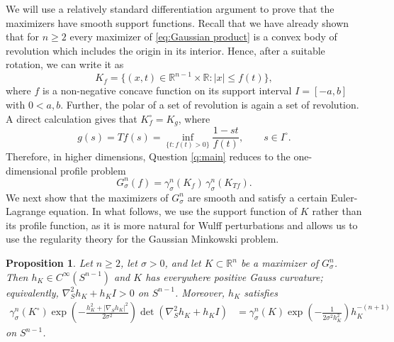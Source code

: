 \documentclass[12pt,oneside,reqno]{amsart}
\numberwithin{equation}{section}
\newtheorem{proposition}[theorem]{Proposition}
\theoremstyle{remark}
\newcommand{\R}{\mathbb R}
\begin{document}
We will use a relatively standard differentiation argument to prove that the maximizers have smooth support functions.
 Recall that we have already shown that for $n\ge 2$ every maximizer of \eqref{eq:Gaussian product} is a convex body of revolution which includes the origin in its interior. Hence, after a suitable rotation, we can write it as
\[
        K_f=\{(x,t)\in\R^{n-1}\times\R: |x|\le f(t)\},
\]
where $f$ is a non-negative concave function on its support interval $I = [-a, b]$ with $0<a,b$. 
Further, the polar of a set of revolution is again a set of revolution. A direct calculation gives that $K_f^\circ=K_g$, where
\begin{equation}\label{eq:T-transform}
        g(s)=Tf(s)=\inf_{\{t:f(t)>0\}}\frac{1-st}{f(t)},\qquad s\in I^\circ.
\end{equation}
Therefore, in higher dimensions, Question \ref{q:main} reduces to the one-dimensional profile problem
\begin{equation}\label{eq:reduced-F}
        G^n_\sigma(f)=\gamma_\sigma^n(K_f)\,\gamma_\sigma^n(K_{Tf}).
\end{equation}
We next show that the maximizers of $G^n_\sigma$ are smooth and satisfy a certain Euler-Lagrange equation. In what follows, we use the support function of \(K\) rather than its profile function, as it is more natural for Wulff perturbations and allows us to use the regularity theory for the Gaussian Minkowski problem.

\begin{proposition}\label{prop:regularity-maximizer}
Let \(n\ge 2\), let \(\sigma>0\), and let
\(K\subset\mathbb R^n\) be a maximizer of \(G_\sigma^n\).
Then $h_K\in C^\infty( S^{n-1})$ and \(K\) has everywhere positive Gauss curvature; equivalently, $ \nabla_S^2h_K+h_KI>0$ on $S^{n-1}$. Moreover, \(h_K\) satisfies \vspace{2mm}
\[
\begin{aligned}
    \gamma_\sigma^n(K^\circ)
    \exp\left(
        -\frac{h_K^2+|\nabla_Sh_K|^2}{2\sigma^2}
    \right)
    \det\left(\nabla_S^2h_K+h_KI\right)
    &=
    \gamma_\sigma^n(K)
    \exp\left(
        -\frac{1}{2\sigma^2h_K^2}
    \right)
    h_K^{-(n+1)}
\end{aligned}
\]
on \( S^{n-1}\).
\end{proposition}
\end{document}
